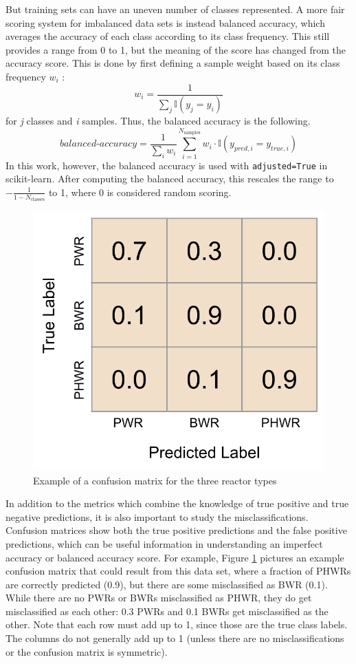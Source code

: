 But training sets can have an uneven number of classes represented.  A more
fair scoring system for imbalanced data sets is instead balanced accuracy,
which averages the accuracy of each class according to its class frequency.
This still provides a range from 0 to 1, but the meaning of the score has
changed from the accuracy score. This is done by first defining a sample weight
based on its class frequency $w_i$ \cite{scikit}: 
\begin{equation}
  w_i = \frac{1}{\sum_j{\mathbb{I}(y_j = y_i)}}
\end{equation}
for \textit{j} classes and \textit{i} samples. Thus, the balanced accuracy is
the following.
\begin{equation}
  \textit{balanced-accuracy} = \frac{1}{\sum_{i}{w_i}} \sum_{i=1}^{N_\text{samples}}
                               w_i \cdot \mathbb{I}(y_{pred, i} = y_{true, i})
\end{equation}
In this work, however, the balanced accuracy is used with
\texttt{adjusted=True} in scikit-learn. After computing the balanced accuracy,
this rescales the range to $-\frac{1}{1-N_\text{classes}}$ to 1, where 0 is
considered random scoring.

\begin{figure}[!htb]
  \centering
  \includegraphics[width=0.4\linewidth]{./chapters/litrev/cm_example.png}
  \caption[Example of a confusion matrix]
          {Example of a confusion matrix for the three reactor types}
  \label{fig:cm_ex}
\end{figure}

In addition to the metrics which combine the knowledge of true positive and
true negative predictions, it is also important to study the
misclassifications. Confusion matrices show both the true positive predictions
and the false positive predictions, which can be useful information in
understanding an imperfect accuracy or balanced accuracy score. For example,
Figure \ref{fig:cm_ex} pictures an example confusion matrix that could result
from this data set, where a fraction of \glspl{PHWR} are correctly predicted
(0.9), but there are some misclassified as \gls{BWR} (0.1).  While there are no
\glspl{PWR} or \glspl{BWR} misclassified as \gls{PHWR}, they do get
misclassified as each other: 0.3 \glspl{PWR} and 0.1 \glspl{BWR} get
misclassified as the other.  Note that each row must add up to 1, since those
are the true class labels. The columns do not generally add up to 1 (unless
there are no misclassifications or the confusion matrix is symmetric).

